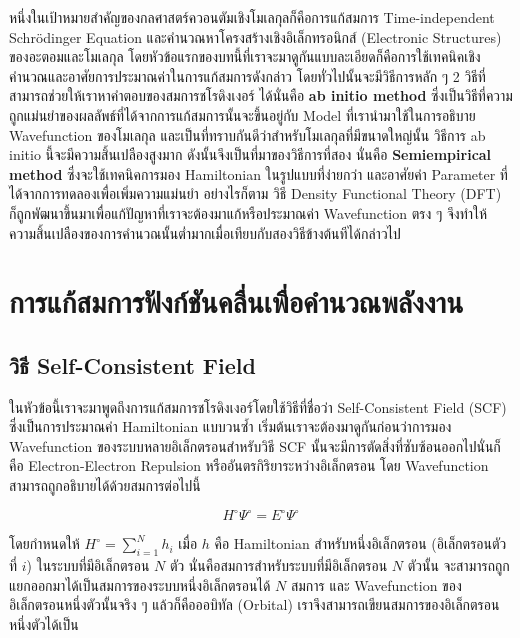 หนึ่งในเป้าหมายสำคัญของกลศาสตร์ควอนตัมเชิงโมเลกุลก็คือการแก้สมการ Time-independent Schrödinger Equation และคำนวณหาโครงสร้างเชิงอิเล็กทรอนิกส์ 
(Electronic Structures) ของอะตอมและโมเลกุล โดยหัวข้อแรกของบทนี้ที่เราจะมาดูกันแบบละเอียดก็คือการใช้เทคนิคเชิงคำนวณและอาศัยการประมาณค่าในการแก้สมการดังกล่าว
โดยทั่วไปนั้นจะมีวิธีการหลัก ๆ 2 วิธีที่สามารถช่วยให้เราหาคำตอบของสมการชโรดิงเงอร์ ได้นั่นคือ \textbf{ab initio method} 
ซึ่งเป็นวิธีที่ความถูกแม่นยำของผลลัพธ์ที่ได้จากการแก้สมการนั้นจะขึ้นอยู่กับ Model ที่เรานำมาใช้ในการอธิบาย Wavefunction ของโมเลกุล 
และเป็นที่ทราบกันดีว่าสำหรับโมเลกุลที่มีขนาดใหญ่นั้น วิธีการ ab initio นี้จะมีความสิ้นเปลืองสูงมาก ดังนั้นจึงเป็นที่มาของวิธีการที่สอง นั่นคือ 
\textbf{Semiempirical method} ซึ่งจะใช้เทคนิคการมอง Hamiltonian ในรูปแบบที่ง่ายกว่า และอาศัยค่า Parameter ที่ได้จากการทดลองเพื่อเพิ่มความแม่นยำ 
อย่างไรก็ตาม วิธี Density Functional Theory (DFT) ก็ถูกพัฒนาขึ้นมาเพื่อแก้ปัญหาที่เราจะต้องมาแก้หรือประมาณค่า Wavefunction ตรง ๆ 
จึงทำให้ความสิ้นเปลืองของการคำนวณนั้นต่ำมากเมื่อเทียบกับสองวิธีข้างต้นทีได้กล่าวไป

\section{การแก้สมการฟังก์ชันคลื่นเพื่อคำนวณพลังงาน}

\subsection{วิธี Self-Consistent Field}

ในหัวข้อนี้เราจะมาพูดถึงการแก้สมการชโรดิงเงอร์โดยใช้วิธีที่ชื่อว่า Self-Consistent Field (SCF) ซึ่งเป็นการประมาณค่า Hamiltonian แบบวนซ้ำ
เริ่มต้นเราจะต้องมาดูกันก่อนว่าการมอง Wavefunction ของระบบหลายอิเล็กตรอนสำหรับวิธี SCF นั้นจะมีการตัดสิ่งที่ซับซ้อนออกไปนั่นก็คือ
Electron-Electron Repulsion หรืออันตรกิริยาระหว่างอิเล็กตรอน โดย Wavefunction สามารถถูกอธิบายได้ด้วยสมการต่อไปนี้

\begin{equation}
    H^{\circ} \Psi^{\circ} = E^{\circ} \Psi^{\circ}
\end{equation}

โดยกำหนดให้ $H^{\circ} = \sum^{N}_{i=1} h_{i}$ เมื่อ $h$ คือ Hamiltonian สำหรับหนึ่งอิเล็กตรอน (อิเล็กตรอนตัวที่ $i$) ในระบบที่มีอิเล็กตรอน $N$ ตัว 
นั่นคือสมการสำหรับระบบที่มีอิเล็กตรอน $N$ ตัวนั้น จะสามารถถูกแยกออกมาได้เป็นสมการของระบบหนึ่งอิเล็กตรอนได้ $N$ สมการ 
และ Wavefunction ของอิเล็กตรอนหนึ่งตัวนั้นจริง ๆ แล้วก็คือออบิทัล (Orbital) เราจึงสามารถเขียนสมการของอิเล็กตรอนหนึ่งตัวได้เป็น

